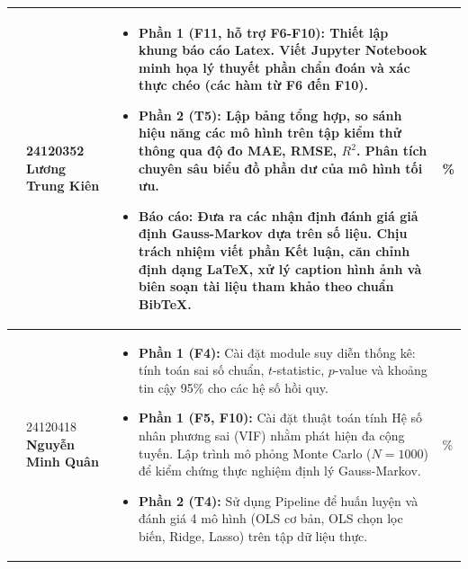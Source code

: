 \begin{longtable}{|p{}|p{}|>{\linespread{1.3}\selectfont\arraybackslash}p{}|p{}|}
    \centering 4 & 
    24120352 \newline \textbf{Lương Trung Kiên} & 
    \vspace{-0.4cm}
    \begin{itemize}[itemsep=0.15cm, topsep=0cm, partopsep=0cm]
        \item \textbf{Phần 1 (F11, hỗ trợ F6-F10):} Thiết lập khung báo cáo Latex. Viết Jupyter Notebook minh họa lý thuyết phần chẩn đoán và xác thực chéo (các hàm từ F6 đến F10).
        \item \textbf{Phần 2 (T5):} Lập bảng tổng hợp, so sánh hiệu năng các mô hình trên tập kiểm thử thông qua độ đo MAE, RMSE, $R^2$. Phân tích chuyên sâu biểu đồ phần dư của mô hình tối ưu.
        \item \textbf{Báo cáo:} Đưa ra các nhận định đánh giá giả định Gauss-Markov dựa trên số liệu. Chịu trách nhiệm viết phần Kết luận, căn chỉnh định dạng \LaTeX, xử lý caption hình ảnh và biên soạn tài liệu tham khảo theo chuẩn BibTeX.
    \end{itemize} \vspace{-0.2cm} & 
    \centering 100\% \tabularnewline \hline
    
    \centering 5 & 
    24120418 \newline \textbf{Nguyễn Minh Quân} & 
    \vspace{-0.4cm}
    \begin{itemize}[itemsep=0.15cm, topsep=0cm, partopsep=0cm]
        \item \textbf{Phần 1 (F4):} Cài đặt module suy diễn thống kê: tính toán sai số chuẩn, $t$-statistic, $p$-value và khoảng tin cậy 95\% cho các hệ số hồi quy.
        \item \textbf{Phần 1 (F5, F10):} Cài đặt thuật toán tính Hệ số nhân phương sai (VIF) nhằm phát hiện đa cộng tuyến. Lập trình mô phỏng Monte Carlo ($N=1000$) để kiểm chứng thực nghiệm định lý Gauss-Markov.
        \item \textbf{Phần 2 (T4):} Sử dụng Pipeline để huấn luyện và đánh giá 4 mô hình (OLS cơ bản, OLS chọn lọc biến, Ridge, Lasso) trên tập dữ liệu thực.
    \end{itemize} \vspace{-0.2cm} & 
    \centering 100\% \tabularnewline \hline
    
\end{longtable}
